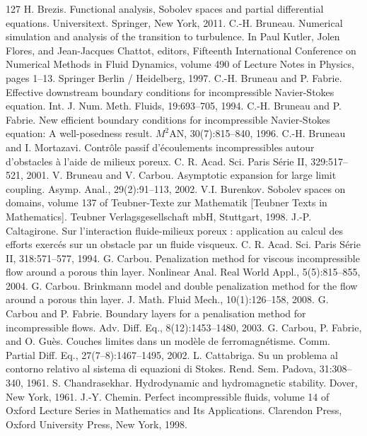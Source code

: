 \begin{thebibliography}{127}
 H. Brezis. Functional analysis, Sobolev spaces and partial differential equations. Universitext. Springer, New York, 2011.
 C.-H. Bruneau. Numerical simulation and analysis of the transition to turbulence. In Paul Kutler, Jolen Flores, and Jean-Jacques Chattot, editors, Fifteenth International Conference on Numerical Methods in Fluid Dynamics, volume 490 of Lecture Notes in Physics, pages 1–13. Springer Berlin / Heidelberg, 1997.
 C.-H. Bruneau and P. Fabrie. Effective downstream boundary conditions for incompressible Navier-Stokes equation. Int. J. Num. Meth. Fluids, 19:693–705, 1994.
 C.-H. Bruneau and P. Fabrie. New efficient boundary conditions for incompressible Navier-Stokes equation: A well-posedness result. $M^2$AN, 30(7):815–840, 1996.
 C.-H. Bruneau and I. Mortazavi. Contrôle passif d’écoulements incompressibles autour d’obstacles à l’aide de milieux poreux. C. R. Acad. Sci. Paris Série II, 329:517–521, 2001.
 V. Bruneau and V. Carbou. Asymptotic expansion for large limit coupling. Asymp. Anal., 29(2):91–113, 2002.
 V.I. Burenkov. Sobolev spaces on domains, volume 137 of Teubner-Texte zur Mathematik [Teubner Texts in Mathematics]. Teubner Verlagsgesellschaft mbH, Stuttgart, 1998.
 J.-P. Caltagirone. Sur l’interaction fluide-milieux poreux : application au calcul des efforts exercés sur un obstacle par un fluide visqueux. C. R. Acad. Sci. Paris Série II, 318:571–577, 1994.
 G. Carbou. Penalization method for viscous incompressible flow around a porous thin layer. Nonlinear Anal. Real World Appl., 5(5):815–855, 2004.
 G. Carbou. Brinkmann model and double penalization method for the flow around a porous thin layer. J. Math. Fluid Mech., 10(1):126–158, 2008.
 G. Carbou and P. Fabrie. Boundary layers for a penalisation method for incompressible flows. Adv. Diff. Eq., 8(12):1453–1480, 2003.
 G. Carbou, P. Fabrie, and O. Guès. Couches limites dans un modèle de ferromagnétisme. Comm. Partial Diff. Eq., 27(7–8):1467–1495, 2002.
 L. Cattabriga. Su un problema al contorno relativo al sistema di equazioni di Stokes. Rend. Sem. Padova, 31:308–340, 1961.
 S. Chandrasekhar. Hydrodynamic and hydromagnetic stability. Dover, New York, 1961.
 J.-Y. Chemin. Perfect incompressible fluids, volume 14 of Oxford Lecture Series in Mathematics and Its Applications. Clarendon Press, Oxford University Press, New York, 1998.

\end{thebibliography}
